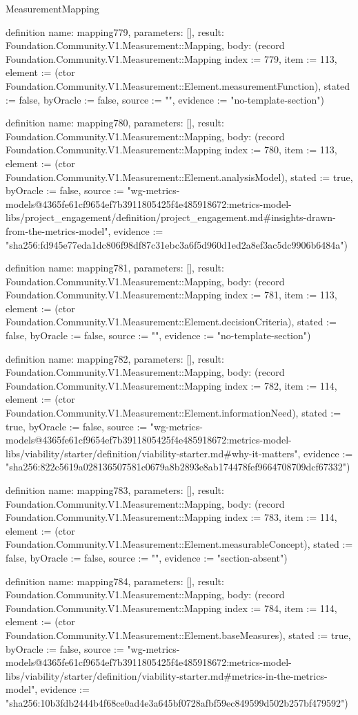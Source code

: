 \begin{lexlean}{MeasurementMapping}
\begin{semanticmodule}
definition{
  name: mapping779,
  parameters: [],
  result: Foundation.Community.V1.Measurement::Mapping,
  body: (record Foundation.Community.V1.Measurement::Mapping {index := 779, item := 113, element := (ctor Foundation.Community.V1.Measurement::Element.measurementFunction), stated := false, byOracle := false, source := "", evidence := "no-template-section"})
}

definition{
  name: mapping780,
  parameters: [],
  result: Foundation.Community.V1.Measurement::Mapping,
  body: (record Foundation.Community.V1.Measurement::Mapping {index := 780, item := 113, element := (ctor Foundation.Community.V1.Measurement::Element.analysisModel), stated := true, byOracle := false, source := "wg-metrics-models@4365fe61cf9654ef7b3911805425f4e485918672:metrics-model-libs/project_engagement/definition/project_engagement.md#insights-drawn-from-the-metrics-model", evidence := "sha256:fd945e77eda1dc806f98df87c31ebc3a6f5d960d1ed2a8ef3ac5dc9906b6484a"})
}

definition{
  name: mapping781,
  parameters: [],
  result: Foundation.Community.V1.Measurement::Mapping,
  body: (record Foundation.Community.V1.Measurement::Mapping {index := 781, item := 113, element := (ctor Foundation.Community.V1.Measurement::Element.decisionCriteria), stated := false, byOracle := false, source := "", evidence := "no-template-section"})
}

definition{
  name: mapping782,
  parameters: [],
  result: Foundation.Community.V1.Measurement::Mapping,
  body: (record Foundation.Community.V1.Measurement::Mapping {index := 782, item := 114, element := (ctor Foundation.Community.V1.Measurement::Element.informationNeed), stated := true, byOracle := false, source := "wg-metrics-models@4365fe61cf9654ef7b3911805425f4e485918672:metrics-model-libs/viability/starter/definition/viability-starter.md#why-it-matters", evidence := "sha256:822c5619a028136507581c0679a8b2893e8ab174478fef9664708709dcf67332"})
}

definition{
  name: mapping783,
  parameters: [],
  result: Foundation.Community.V1.Measurement::Mapping,
  body: (record Foundation.Community.V1.Measurement::Mapping {index := 783, item := 114, element := (ctor Foundation.Community.V1.Measurement::Element.measurableConcept), stated := false, byOracle := false, source := "", evidence := "section-absent"})
}

definition{
  name: mapping784,
  parameters: [],
  result: Foundation.Community.V1.Measurement::Mapping,
  body: (record Foundation.Community.V1.Measurement::Mapping {index := 784, item := 114, element := (ctor Foundation.Community.V1.Measurement::Element.baseMeasures), stated := true, byOracle := false, source := "wg-metrics-models@4365fe61cf9654ef7b3911805425f4e485918672:metrics-model-libs/viability/starter/definition/viability-starter.md#metrics-in-the-metrics-model", evidence := "sha256:10b3fdb2444b4f68ce0ad4e3a645bf0728afbf59ec849599d502b257bf479592"})
}


\end{semanticmodule}
\end{lexlean}
